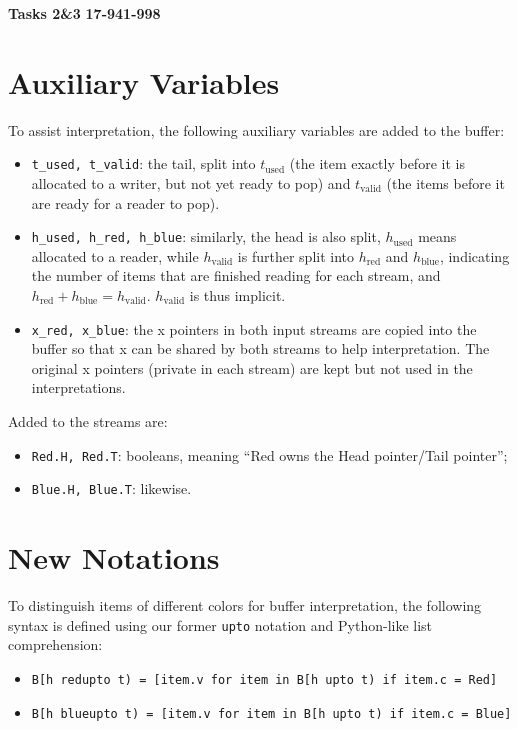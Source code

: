 \documentclass[a4paper, 11pt]{article}
\begin{document}
\noindent
\large\textbf{Tasks 2\&3} \hfill \textbf{17-941-998}

\section*{Auxiliary Variables}
To assist interpretation, the following auxiliary variables are added to the buffer:
\begin{itemize}
    \item \texttt{t\_used, t\_valid}: the tail, split into $t_\text{used}$ (the item exactly before it is allocated to a writer, but not yet ready to pop) and $t_\text{valid}$ (the items before it are ready for a reader to pop).
    \item \texttt{h\_used, h\_red, h\_blue}: similarly, the head is also split, $h_\text{used}$ means allocated to a reader, while $h_\text{valid}$ is further split into $h_\text{red}$ and $h_\text{blue}$, indicating the number of items that are finished reading for each stream, and $h_\text{red} + h_\text{blue} = h_\text{valid}$. $h_\text{valid}$ is thus implicit.
    \item \texttt{x\_red, x\_blue}: the x pointers in both input streams are copied into the buffer so that x can be shared by both streams to help interpretation. The original x pointers (private in each stream) are kept but not used in the interpretations.
\end{itemize}

\noindent Added to the streams are:
\begin{itemize}
    \item \texttt{Red.H, Red.T}: booleans, meaning ``Red owns the Head pointer/Tail pointer'';
    \item \texttt{Blue.H, Blue.T}: likewise.
\end{itemize}

\section*{New Notations}
To distinguish items of different colors for buffer interpretation, the following syntax is defined using our former \texttt{upto} notation and Python-like list comprehension:
\begin{itemize}
    \item \texttt{B[h redupto t) = [item.v for item in B[h upto t) if item.c = Red]}
    \item \texttt{B[h blueupto t) = [item.v for item in B[h upto t) if item.c = Blue]}
\end{itemize}
\end{document}
